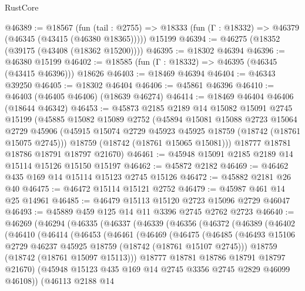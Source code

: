 \begin{lexlean}{RustCore}
\begin{coremodule}
@46389 := @18567
    (fun (tail : @2755) => @18333 (fun (Γ : @18332) => @46379 (@46345 (@43415 (@46380 @18365)))))
    @15199
@46394 := @46275 (@18352 (@39175 (@43408 (@18362 @15200))))
@46395 := @18302 @46394
@46396 := @46380 @15199
@46402 := @18585 (fun (Γ : @18332) => @46395 (@46345 (@43415 @46396))) @18626
@46403 := @18469 @46394
@46404 := @46343 @39250
@46405 := @18302 @46404
@46406 := @45861 @46396
@46410 := @46403 (@46405 @46406) (@18639 @46274)
@46414 := @18469 @46404 @46406 (@18644 @46342)
@46453 := @45873
    @2185
    @2189
    @14
    @15082
    @15091
    @2745
    @15199
    (@45885
      @15082
      @15089
      @2752
      (@45894
        @15081
        @15088
        @2723
        @15064
        @2729
        @45906
        (@45915 @15074 @2729 @45923 @45925 @18759 (@18742 (@18761 @15075 @2745)))
        @18759
        (@18742 (@18761 @15065 @15081)))
      @18777
      @18781
      @18786
      @18791
      @18797
      @21670)
@46461 := @45948 @15091 @2185 @2189 @14 @15114 @15126 @15150 @15197
@46462 := @45872 @2182
@46469 := @46462 @435 @169 @14 @15114 @15123 @2745 @15126
@46472 := @45882 @2181 @26 @40
@46475 := @46472 @15114 @15121 @2752
@46479 := @45987 @461 @14 @25 @14961
@46485 := @46479 @15113 @15120 @2723 @15096 @2729 @46047
@46493 := @45889 @459 @125 @14 @11 @3396 @2745 @2762 @2723
@46640 := @46269
    (@46294
      (@46335
        (@46337
          (@46339
            (@46356
              (@46372
                (@46389
                  (@46402
                    (@46410
                      (@46414
                        (@46453
                          (@46461
                            (@46469
                              (@46475
                                (@46485
                                  (@46493
                                    @15106
                                    @2729
                                    @46237
                                    @45925
                                    @18759
                                    (@18742 (@18761 @15107 @2745)))
                                  @18759
                                  (@18742 (@18761 @15097 @15113)))
                                @18777
                                @18781
                                @18786
                                @18791
                                @18797
                                @21670)
                              (@45948 @15123 @435 @169 @14 @2745 @3356 @2745 @2829 @46099 @46108))
                            (@46113
                              @2188
                              @14

\end{coremodule}
\end{lexlean}
